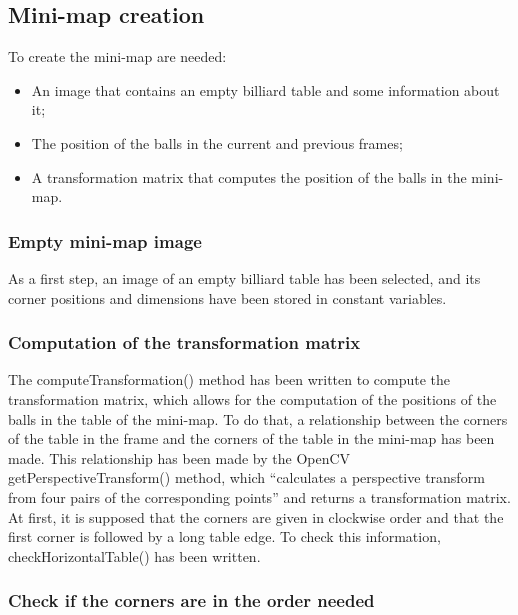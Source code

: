\subsection{Mini-map creation}

To create the mini-map are needed:
\begin{itemize}
	\item An image that contains an empty billiard table and some information about it;
	\item The position of the balls in the current and previous frames;
	\item A transformation matrix that computes the position of the balls in the mini-map.
\end{itemize}

\subsubsection{Empty mini-map image}

As a first step, an image of an empty billiard table has been selected, and its corner positions and dimensions have been stored in constant variables.

\subsubsection{Computation of the transformation matrix}

The computeTransformation() method has been written to compute the transformation matrix, which allows for the computation of the positions of the balls in the table of the mini-map. To do that, a relationship between the corners of the table in the frame and the corners of the table in the mini-map has been made. This relationship has been made by the OpenCV getPerspectiveTransform() method, which “calculates a perspective transform from four pairs of the corresponding points” and returns a transformation matrix. At first, it is supposed that the corners are given in clockwise order and that the first corner is followed by a long table edge. To check this information, checkHorizontalTable() has been written. 

\subsubsection{Check if the corners are in the order needed}

